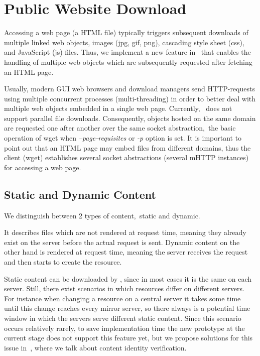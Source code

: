 \section{Public Website Download}
\label{sec:website-download}

Accessing a web page (\ie a HTML file) typically triggers subsequent downloads
of multiple linked web objects, \eg images (jpg, gif, png), cascading style
sheet (css), and JavaScript (js) files. Thus, we implement a new feature in
\mhttp~that enables the handling of multiple web objects which are subsequently
requested after fetching an HTML page.

Usually, modern GUI web browsers and download managers send HTTP-requests using multiple concurrent processes (multi-threading) in order to better deal with multiple web objects embedded in a single web page. 
Currently, \protonew~does not support parallel file downloads. 
Consequently, objects hosted on the same domain are requested one after another over the same socket abstraction,~\ie the basic operation of wget when \emph{--page-requisites} or \emph{-p} option is set. 
It is important to point out that an HTML page may embed files from different domains, thus the client (wget) establishes several socket abstractions (\ie several mHTTP instances) for accessing a web page. 

\subsection{Static and Dynamic Content}
\label{sec:dynamic-content}

We distinguish between 2 types of content,~\ie static and dynamic. 

It describes files which are not rendered at request time, meaning they already exist on the server before the actual request is sent. 
Dynamic content on the other hand is rendered at request time, meaning the server receives the request and then starts to create the resource. 

Static content can be downloaded by \mhttp, since in most cases it is the same on each server. 
Still, there exist scenarios in which resources differ on different servers. 
For instance when changing a resource on a central server it takes some time until this change reaches every mirror server, so there always is a potential time window in which the servers serve different static content. 
Since this scenario occurs relatively rarely, to save implementation time the new prototype at the current stage does not support this feature yet, but we propose solutions for this issue in~, where we talk about content identity verification. 


